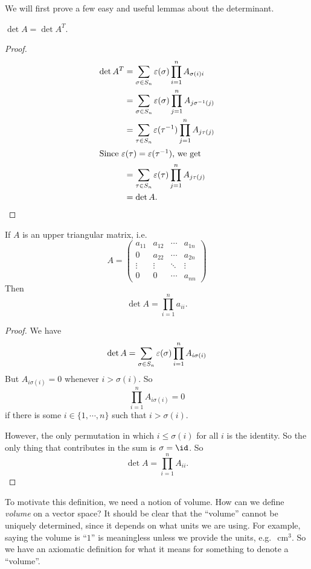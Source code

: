 \documentclass[a4paper]{article}
\begin{document}
We will first prove a few easy and useful lemmas about the determinant.
\begin{lemma}
  $\det A = \det A^T$.
\end{lemma}

\begin{proof}
  \begin{align*}
    \det A^T &= \sum_{\sigma \in S_n} \varepsilon(\sigma) \prod_{i = 1}^n A_{\sigma(i)i}\\
    &= \sum_{\sigma \in S_n} \varepsilon (\sigma) \prod_{j = 1}^n A_{j \sigma^{-1}(j)}\\
    &= \sum_{\tau \in S_n} \varepsilon (\tau^{-1}) \prod_{j = 1}^n A_{j \tau (j)}\\
    \intertext{Since $\varepsilon(\tau) = \varepsilon(\tau^{-1})$, we get}
    &= \sum_{\tau \in S_n} \varepsilon (\tau) \prod_{j = 1}^n A_{j \tau (j)}\\
    &= \det A.
  \end{align*}
\end{proof}

\begin{lemma}
  If $A$ is an upper triangular matrix, i.e.
  \[
    A =
    \begin{pmatrix}
      a_{11} & a_{12} & \cdots & a_{1n}\\
      0 & a_{22} & \cdots & a_{2n}\\
      \vdots & \vdots & \ddots & \vdots\\
      0 & 0 & \cdots & a_{nn}
    \end{pmatrix}
  \]
  Then
  \[
    \det A = \prod_{i = 1}^n a_{ii}.
  \]
\end{lemma}

\begin{proof}
  We have
  \[
    \det A = \sum_{\sigma \in S_n} \varepsilon(\sigma) \prod_{i = 1}^n A_{i\sigma (i)}\\
  \]
  But $A_{i \sigma(i)} = 0$ whenever $i > \sigma(i)$. So
  \[
    \prod_{i = 1}^n A_{i\sigma(i)} = 0
  \]
  if there is some $i \in \{1, \cdots, n\}$ such that $i > \sigma(i)$.

  However, the only permutation in which $i \leq \sigma(i)$ for all $i$ is the identity. So the only thing that contributes in the sum is $\sigma = \id$. So
  \[
    \det A = \prod_{i = 1}^n A_{ii}.
  \]
\end{proof}
To motivate this definition, we need a notion of volume. How can we define \emph{volume} on a vector space? It should be clear that the ``volume'' cannot be uniquely determined, since it depends on what units we are using. For example, saying the volume is ``$1$'' is meaningless unless we provide the units, e.g.\ $\SI{}{\centi\meter\cubed}$. So we have an axiomatic definition for what it means for something to denote a ``volume''.
\end{document}

